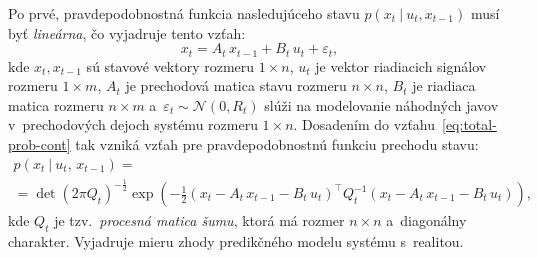       \begin{algorithm}[b]
      \caption[Lineárny Kalmanov filter]{Lineárny Kalmanov filter podľa~\cite{thrunProbabilisticRobotics2005}}\label{alg:kalman}
      \begin{algorithmic}



      \end{algorithmic}
    \end{algorithm}

      Po prvé, pravdepodobnostná funkcia nasledujúceho stavu $p(x_t\ |\ u_t, x_{t-1})$ musí byť \emph{lineárna}, čo vyjadruje tento vzťah:
      \begin{equation}
        x_t = A_t\, x_{t-1} + B_t\, u_t + \varepsilon_t,
      \end{equation}
      kde $x_t, x_{t-1}$ sú stavové vektory rozmeru $1\times n$, $u_t$ je vektor riadiacich signálov rozmeru $1\times m$, $A_t$ je prechodová matica stavu rozmeru $n\times n$, $B_t$ je riadiaca matica rozmeru $n\times m$ a~$\varepsilon_t \sim \mathcal{N}(0, R_t)$ slúži na modelovanie náhodných javov v~prechodových dejoch systému rozmeru $1\times n$. Dosadením do vzťahu~\ref{eq:total-prob-cont} tak vzniká vzťah pre pravdepodobnostnú funkciu prechodu stavu:
      \begin{multline}
        p (x_t\ |\ u_t,\, x_{t-1}) = \\
        =\det{(2\pi{} Q_t)}^{-\frac{1}{2}} \exp{\left(-\frac{1}{2} {(x_t - A_t\, x_{t-1} - B_t\, u_t)}^{\top} Q_t^{-1} (x_t - A_t\, x_{t-1} - B_t\, u_t) \right)},
      \end{multline}
      kde $Q_t$ je tzv.\ \emph{procesná matica šumu}, ktorá má rozmer $n\times n$ a~diagonálny charakter. Vyjadruje mieru zhody predikčného modelu systému s~realitou.

